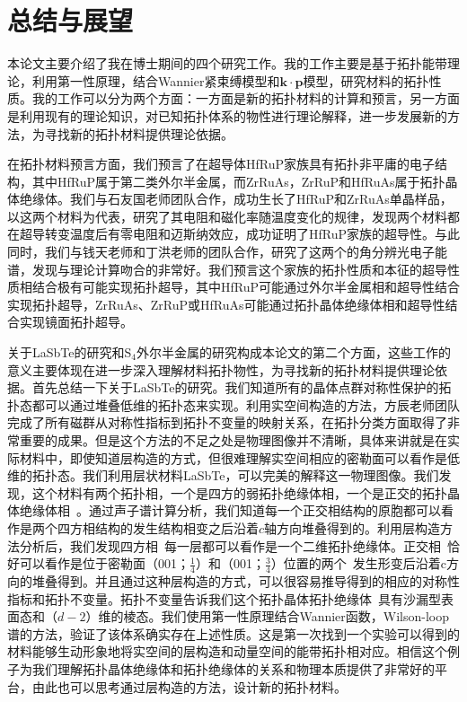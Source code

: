 \chapter{总结与展望}\label{chap:summary}
本论文主要介绍了我在博士期间的四个研究工作。我的工作主要是基于拓扑能带理论，利用第一性原理，结合Wannier紧束缚模型和$\mathbf{k\cdot p}$模型，研究材料的拓扑性质。我的工作可以分为两个方面：一方面是新的拓扑材料的计算和预言，另一方面是利用现有的理论知识，对已知拓扑体系的物性进行理论解释，进一步发展新的方法，为寻找新的拓扑材料提供理论依据。

在拓扑材料预言方面，我们预言了在超导体HfRuP家族具有拓扑非平庸的电子结构，其中HfRuP属于第二类外尔半金属，而ZrRuAs，ZrRuP和HfRuAs属于拓扑晶体绝缘体。我们与石友国老师团队合作，成功生长了HfRuP和ZrRuAs单晶样品，以这两个材料为代表，研究了其电阻和磁化率随温度变化的规律，发现两个材料都在超导转变温度后有零电阻和迈斯纳效应，成功证明了HfRuP家族的超导性。与此同时，我们与钱天老师和丁洪老师的团队合作，研究了这两个的角分辨光电子能谱，发现与理论计算吻合的非常好。我们预言这个家族的拓扑性质和本征的超导性质相结合极有可能实现拓扑超导，其中HfRuP可能通过外尔半金属相和超导性结合实现拓扑超导，ZrRuAs、ZrRuP或HfRuAs可能通过拓扑晶体绝缘体相和超导性结合实现镜面拓扑超导。

关于LaSbTe的研究和S$_4$外尔半金属的研究构成本论文的第二个方面，这些工作的意义主要体现在进一步深入理解材料拓扑物性，为寻找新的拓扑材料提供理论依据。首先总结一下关于LaSbTe的研究。我们知道所有的晶体点群对称性保护的拓扑态都可以通过堆叠低维的拓扑态来实现。利用实空间构造的方法，方辰老师团队完成了所有磁群从对称性指标到拓扑不变量的映射关系，在拓扑分类方面取得了非常重要的成果。但是这个方法的不足之处是物理图像并不清晰，具体来讲就是在实际材料中，即使知道层构造的方式，但很难理解实空间相应的密勒面可以看作是低维的拓扑态。我们利用层状材料LaSbTe，可以完美的解释这一物理图像。我们发现，这个材料有两个拓扑相，一个是四方的弱拓扑绝缘体相\ti，一个是正交的拓扑晶体绝缘体相\tci~。通过声子谱计算分析，我们知道每一个正交相结构的原胞都可以看作是两个四方相结构的发生结构相变之后沿着$c$轴方向堆叠得到的。利用层构造方法分析后，我们发现四方相\ti~每一层都可以看作是一个二维拓扑绝缘体。正交相\tci~恰好可以看作是位于密勒面（001；$\frac{1}{4}$）和（001；$\frac{3}{4}$）位置的两个\ti~发生形变后沿着c方向的堆叠得到。并且通过这种层构造的方式，可以很容易推导得到的相应的对称性指标和拓扑不变量。拓扑不变量告诉我们这个拓扑晶体拓扑绝缘体\tci~具有沙漏型表面态和（$d-2$）维的棱态。我们使用第一性原理结合Wannier函数，Wilson-loop谱的方法，验证了该体系确实存在上述性质。这是第一次找到一个实验可以得到的材料能够生动形象地将实空间的层构造和动量空间的能带拓扑相对应。相信这个例子为我们理解拓扑晶体绝缘体和拓扑绝缘体的关系和物理本质提供了非常好的平台，由此也可以思考通过层构造的方法，设计新的拓扑材料。


